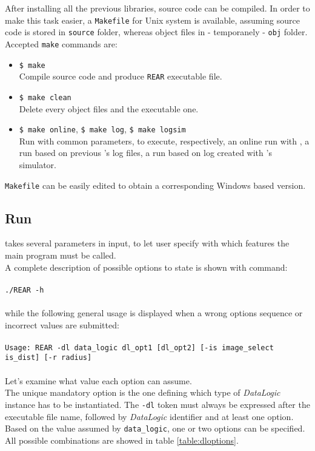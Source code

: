 After installing all the previous libraries, \framework{}
source code can be compiled. In order to make this
task easier, a \texttt{Makefile} for Unix system
is available, assuming source code is stored in
\texttt{source} folder, whereas object files in - 
temporanely - \texttt{obj} folder.
\\
Accepted \texttt{make} commands are: 

\begin{itemize}

  \item \texttt{\$ make} \\
    Compile source code and produce \texttt{REAR} executable
    file.

  \item \texttt{\$ make clean} \\
    Delete every object files and the executable one.

  \item \texttt{\$ make online}, \texttt{\$ make log}, \texttt{\$ make logsim} \\
    Run \framework{} with common parameters, to execute, respectively,
    an online run with \morduc{}, a run based on previous \morduc{}'s log files,
    a run based on log created with \morduc{}'s simulator.

\end{itemize}

\texttt{Makefile} can be easily edited to obtain a corresponding
Windows based version.


\subsection{Run \framework{}}
\label{sourcecode:downloadrun:run}

\framework{} takes several parameters in input, to let
user specify with which features the main program must be called. 
\\
A complete description of possible options to state is
shown with command:
\\
\\
\texttt{./REAR -h}
\\
\\
while the following general usage is displayed when a wrong options sequence
or incorrect values are submitted:
\\
\\
\texttt{Usage: REAR -dl data\_logic dl\_opt1 [dl\_opt2]
  [-is image\_select is\_dist] [-r radius]}
\\
\\
Let's examine what value each option can assume.
\\
The unique mandatory option is the one defining which type
of \textit{DataLogic} instance has to be instantiated. The
\texttt{-dl} token must always be expressed after the
executable file name, followed by \textit{DataLogic} identifier
and at least one option.
\\
Based on the value assumed by \texttt{data\_logic}, one or
two options can be specified. All possible combinations
are showed in table \ref{table:dloptions}.

